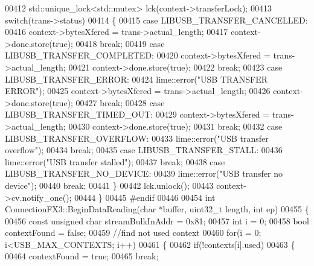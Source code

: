 \begin{DoxyCode}
{{00412     std::unique\_lock<std::mutex> lck(context->transferLock);
00413     \textcolor{keywordflow}{switch}(trans->status)
00414     \{
00415     \textcolor{keywordflow}{case} LIBUSB\_TRANSFER\_CANCELLED:
00416         context->bytesXfered = trans->actual\_length;
00417         context->done.store(\textcolor{keyword}{true});
00418         \textcolor{keywordflow}{break};
00419     \textcolor{keywordflow}{case} LIBUSB\_TRANSFER\_COMPLETED:
00420         context->bytesXfered = trans->actual\_length;
00421         context->done.store(\textcolor{keyword}{true});
00422         \textcolor{keywordflow}{break};
00423     \textcolor{keywordflow}{case} LIBUSB\_TRANSFER\_ERROR:
00424         lime::error(\textcolor{stringliteral}{"USB TRANSFER ERROR"});
00425         context->bytesXfered = trans->actual\_length;
00426         context->done.store(\textcolor{keyword}{true});
00427         \textcolor{keywordflow}{break};
00428     \textcolor{keywordflow}{case} LIBUSB\_TRANSFER\_TIMED\_OUT:
00429         context->bytesXfered = trans->actual\_length;
00430         context->done.store(\textcolor{keyword}{true});
00431         \textcolor{keywordflow}{break};
00432     \textcolor{keywordflow}{case} LIBUSB\_TRANSFER\_OVERFLOW:
00433         lime::error(\textcolor{stringliteral}{"USB transfer overflow"});
00434         \textcolor{keywordflow}{break};
00435     \textcolor{keywordflow}{case} LIBUSB\_TRANSFER\_STALL:
00436         lime::error(\textcolor{stringliteral}{"USB transfer stalled"});
00437         \textcolor{keywordflow}{break};
00438     \textcolor{keywordflow}{case} LIBUSB\_TRANSFER\_NO\_DEVICE:
00439         lime::error(\textcolor{stringliteral}{"USB transfer no device"});
00440         \textcolor{keywordflow}{break};
00441     \}
00442     lck.unlock();
00443     context->cv.notify\_one();
00444 \}
00445 \textcolor{preprocessor}{#endif}
00446 
00454 \textcolor{keywordtype}{int} ConnectionFX3::BeginDataReading(\textcolor{keywordtype}{char} *buffer, uint32\_t length, \textcolor{keywordtype}{int} ep)
00455 \{
00456     \textcolor{keyword}{const} \textcolor{keywordtype}{unsigned} \textcolor{keywordtype}{char} streamBulkInAddr = 0x81;
00457     \textcolor{keywordtype}{int} i = 0;
00458     \textcolor{keywordtype}{bool} contextFound = \textcolor{keyword}{false};
00459     \textcolor{comment}{//find not used context}
00460     \textcolor{keywordflow}{for}(i = 0; i<USB\_MAX\_CONTEXTS; i++)
00461     \{
00462         \textcolor{keywordflow}{if}(!contexts[i].used)
00463         \{
00464             contextFound = \textcolor{keyword}{true};
00465             \textcolor{keywordflow}{break};
}}
\end{DoxyCode}
